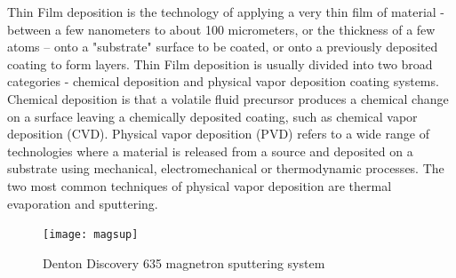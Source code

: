 Thin Film deposition is the technology of applying a very thin film of material - between a few nanometers to about 100 micrometers, or the thickness of a few atoms – onto a "substrate" surface  to be coated, or onto a previously deposited coating to form layers. Thin Film deposition is usually divided into two broad categories - chemical deposition and physical vapor deposition coating systems. Chemical deposition is that a volatile fluid precursor produces a chemical change on a surface leaving a chemically deposited coating, such as chemical vapor  deposition (CVD). Physical vapor deposition (PVD)  refers to a wide range of technologies where a material is released from a source and deposited on a substrate  using mechanical, electromechanical or thermodynamic processes. The two most common techniques of physical vapor deposition are thermal evaporation and sputtering.

\begin{figure}[H] 
\centering    
\texttt{[image: magsup]}
\caption[Denton Discovery 635 magnetron sputtering system]{Denton Discovery 635 magnetron sputtering system}
\label{fig:magsup}
\end{figure}

